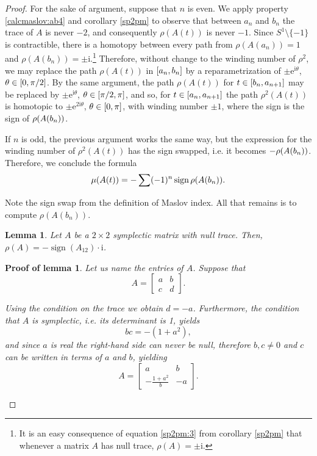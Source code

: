\documentclass{article}
\newtheorem{lemma}{Lemma}
\theoremstyle{nonumberplain}
\newtheorem{proof}{Proof}
\newtheorem{lemmaproof}{Proof of lemma}
\newcommand{\I}{\mathrm{i}}
\newcommand{\e}{\mathrm{e}}
\DeclareMathOperator{\sign}{sign}
\let\Im\relax
\DeclareMathOperator{\Im}{Im}
\begin{document}
\begin{proof}
For the sake of argument, suppose that $n$ is even. We apply property \ref{calcmaslov:ab4} and corollary \ref{sp2pm} to observe that between $a_n$ and $b_n$ the trace of $A$ is never $-2$, and consequently $\rho(A(t))$ is never $-1$. Since $S^1 \setminus \{-1\}$ is contractible, there is a homotopy between every path from $\rho(A(a_n)) = 1$ and $\rho(A(b_n)) = \pm\I$.\footnote{It is an easy consequence of equation \eqref{sp2pm:3} from corollary \ref{sp2pm} that whenever a matrix $A$ has null trace, $\rho(A) = \pm \I$.} Therefore, without change to the winding number of $\rho^2$, we may replace the path $\rho(A(t))$ in $\interval{a_n}{b_n}$ by a reparametrization of $\pm \e^{\I \theta}$, $\theta \in \interval 0 {\pi/2}$. By the same argument, the path $\rho(A(t))$ for $t \in \interval{b_n}{a_{n+1}}$ may be replaced by $\pm \e^{\I \theta}$, $\theta \in \interval{\pi/2}\pi$, and so, for $t \in \interval{a_n}{a_{n+1}}$ the path $\rho^2(A(t))$ is homotopic to $\pm \e^{2 \I \theta}$, $\theta \in \interval 0 \pi$, with winding number $\pm 1$, where the sign is the sign of $\Im \rho(A(b_n))$.

If $n$ is odd, the previous argument works the same way, but the expression for the winding number of $\rho^2(A(t))$ has the sign swapped, i.e. it becomes $- \Im \rho(A(b_n))$. Therefore, we conclude the formula
\begin{equation}
\mu(A(t)) = -\sum (-1)^n \sign \Im \rho(A(b_n)).
\end{equation}

Note the sign swap from the definition of Maslov index. All that remains is to compute $\rho(A(b_n))$.

\begin{lemma}
Let $A$ be a $2 \times 2$ symplectic matrix with null trace. Then, $\rho(A) = -\sign(A_{12}) \cdot  \I$.
\end{lemma}

\begin{lemmaproof}
Let us name the entries of $A$. Suppose that
\begin{equation}
A = \begin{bmatrix}
a & b\\
c & d
\end{bmatrix}.
\end{equation}

Using the condition on the trace we obtain $d = -a$. Furthermore, the condition that $A$ is symplectic, i.e. its determinant is 1, yields
\begin{equation}
bc = -(1 + a^2),
\end{equation}
and since $a$ is real the right-hand side can never be null, therefore $b, c \neq 0$ and $c$ can be written in terms of $a$ and $b$, yielding
\begin{equation}
A = \begin{bmatrix}
a & b\\
-\frac{1+a^2}b & -a
\end{bmatrix}.
\end{equation}


\end{lemmaproof}
\end{proof}
\end{document}
